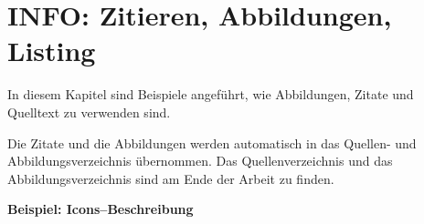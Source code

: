 

\chapter*{INFO: Zitieren, Abbildungen, Listing}

In diesem Kapitel sind Beispiele angeführt, wie Abbildungen, Zitate und Quelltext zu verwenden sind.

Die Zitate und die Abbildungen werden automatisch in das Quellen- und Abbildungsverzeichnis übernommen. Das Quellenverzeichnis und das Abbildungsverzeichnis sind am Ende der Arbeit zu finden.   

\textbf{Beispiel: Icons--Beschreibung}
\setlength{\extrarowheight}{0.1cm}

